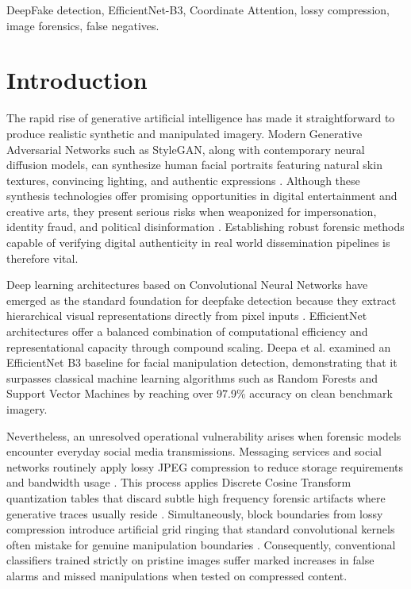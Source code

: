 \documentclass[conference]{IEEEtran}
\begin{document}
\begin{IEEEkeywords}
DeepFake detection, EfficientNet-B3, Coordinate Attention, lossy compression, image forensics, false negatives.
\end{IEEEkeywords}

\section{Introduction}
The rapid rise of generative artificial intelligence has made it straightforward to produce realistic synthetic and manipulated imagery. Modern Generative Adversarial Networks such as StyleGAN, along with contemporary neural diffusion models, can synthesize human facial portraits featuring natural skin textures, convincing lighting, and authentic expressions \cite{goodfellow2014generative, karras2019style}. Although these synthesis technologies offer promising opportunities in digital entertainment and creative arts, they present serious risks when weaponized for impersonation, identity fraud, and political disinformation \cite{mirsky2021creation}. Establishing robust forensic methods capable of verifying digital authenticity in real world dissemination pipelines is therefore vital.

Deep learning architectures based on Convolutional Neural Networks have emerged as the standard foundation for deepfake detection because they extract hierarchical visual representations directly from pixel inputs \cite{tan2019efficientnet}. EfficientNet architectures offer a balanced combination of computational efficiency and representational capacity through compound scaling. Deepa et al. \cite{deepa2026enhanced} examined an EfficientNet B3 baseline for facial manipulation detection, demonstrating that it surpasses classical machine learning algorithms such as Random Forests and Support Vector Machines by reaching over 97.9\% accuracy on clean benchmark imagery.

Nevertheless, an unresolved operational vulnerability arises when forensic models encounter everyday social media transmissions. Messaging services and social networks routinely apply lossy JPEG compression to reduce storage requirements and bandwidth usage \cite{verdoliva2020media}. This process applies Discrete Cosine Transform quantization tables that discard subtle high frequency forensic artifacts where generative traces usually reside \cite{rossler2019faceforensics}. Simultaneously, block boundaries from lossy compression introduce artificial grid ringing that standard convolutional kernels often mistake for genuine manipulation boundaries \cite{bondi2020training}. Consequently, conventional classifiers trained strictly on pristine images suffer marked increases in false alarms and missed manipulations when tested on compressed content.
\end{document}
